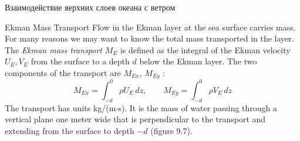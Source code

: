 \begin{chapter}{Взаимодействие верхних слоев океана с ветром}
\begin{section}{Ekman Mass Transport}
 Flow in the
Ekman layer at the sea surface carries mass. For many reasons we may
want to know the total mass transported in the layer. The
\textit{Ekman mass transport} $M_E$ is defined as the integral of the
Ekman velocity $U_E, V_E$ from the surface to a depth $d$ below the
Ekman layer. The two components of the transport are $M_{Ex}$,
$M_{Ey}$ :
\begin{equation}
 M_{Ex} = \int^0_{-d} \rho U_E \, dz, \qquad
 M_{Ey} = \int^0_{-d} \rho V_E \, dz
\end{equation}
The transport has units kg/(m$\cdot$s). It is the mass of water
passing through a vertical plane one meter wide that is perpendicular
to the transport and extending from the surface to depth $-d$ 
(figure 9.7).
%


\end{section}
\end{chapter}
